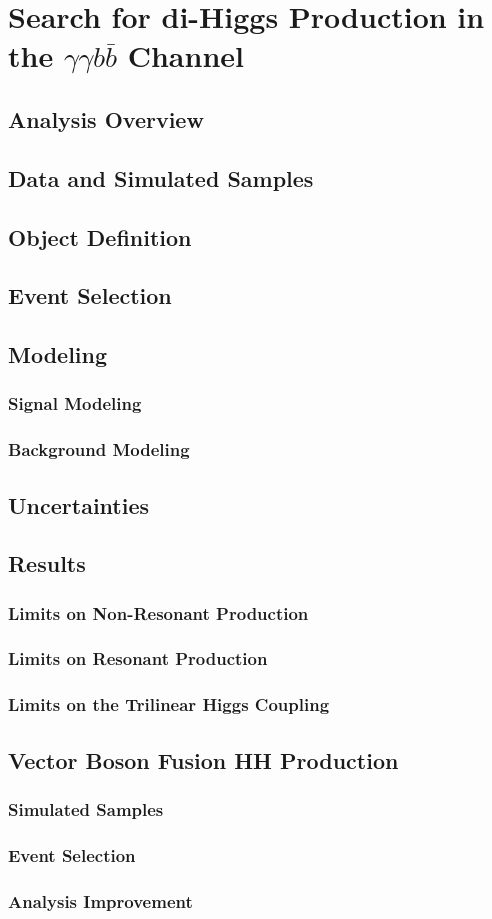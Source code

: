 \chapter{Search for di-Higgs Production in the \texorpdfstring{$\gamma\gamma b\bar{b}$}{yybb} Channel}
\section{Analysis Overview}
\section{Data and Simulated Samples}
\section{Object Definition}
\section{Event Selection}
\section{Modeling}
\subsection{Signal Modeling}
\subsection{Background Modeling}
\section{Uncertainties}
\section{Results}
\subsection{Limits on Non-Resonant Production}
\subsection{Limits on Resonant Production}
\subsection{Limits on the Trilinear Higgs Coupling}
\section{Vector Boson Fusion HH Production}
\subsection{Simulated Samples}
\subsection{Event Selection}
\subsection{Analysis Improvement}
